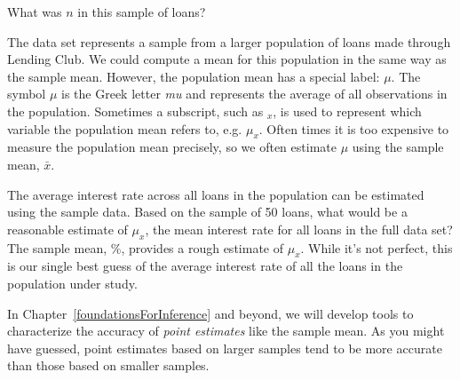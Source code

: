 \begin{exercisewrap}
\begin{nexercise}
What was $n$ in this sample of
loans?\footnotemark{}
\end{nexercise}
\end{exercisewrap}

The  data set represents a sample from
a larger population of loans made through Lending Club.
We could compute a mean for this population in the same way
as the sample mean.
However, the population mean has a special label: $\mu$.
The symbol $\mu$ is the Greek letter \emph{mu} and represents
the average of all observations in the population.
Sometimes a subscript, such as $_x$,
is used to represent which variable the population mean
refers to, e.g. $\mu_x$.
Often times it is too expensive to measure the
population mean precisely, so we often estimate
$\mu$ using the sample mean, $\bar{x}$.

\begin{examplewrap}
\begin{nexample}{The average interest rate across all loans
    in the population can be estimated using the sample data.
    Based on the sample of 50 loans,
    what would be a reasonable estimate of $\mu_x$,
    the mean interest rate for all loans in the
    full data set?}
  The sample mean, \loanAvg{}\%, provides a rough estimate
  of $\mu_x$.
  While it's not perfect, this is our single best guess
  of the average interest rate of all the loans in the
  population under study.

  In Chapter~\ref{foundationsForInference} and beyond,
  we will develop tools to characterize the accuracy
  of \emph{point estimates}
  like the sample mean.
  As you might have guessed,
  point estimates based on larger samples tend to be
  more accurate than those based on smaller samples.
\end{nexample}
\end{examplewrap}



